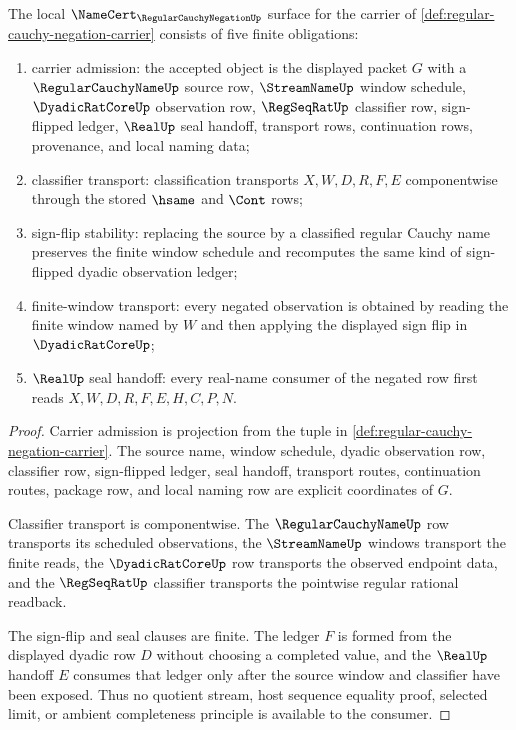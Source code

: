 \begin{theorem}
\label{thm:regular-cauchy-negation-namecert-obligations}
The local $\NameCert_{\RegularCauchyNegationUp}$ surface for the carrier of \autoref{def:regular-cauchy-negation-carrier} consists of five finite obligations:
\begin{enumerate}
\item carrier admission: the accepted object is the displayed packet $G$ with a $\RegularCauchyNameUp$ source row, $\StreamNameUp$ window schedule, $\DyadicRatCoreUp$ observation row, $\RegSeqRatUp$ classifier row, sign-flipped ledger, $\RealUp$ seal handoff, transport rows, continuation rows, provenance, and local naming data;
\item classifier transport: classification transports $X,W,D,R,F,E$ componentwise through the stored $\hsame$ and $\Cont$ rows;
\item sign-flip stability: replacing the source by a classified regular Cauchy name preserves the finite window schedule and recomputes the same kind of sign-flipped dyadic observation ledger;
\item finite-window transport: every negated observation is obtained by reading the finite window named by $W$ and then applying the displayed sign flip in $\DyadicRatCoreUp$;
\item $\RealUp$ seal handoff: every real-name consumer of the negated row first reads $X,W,D,R,F,E,H,C,P,N$.
\end{enumerate}
\end{theorem}
\begin{proof}
Carrier admission is projection from the tuple in \autoref{def:regular-cauchy-negation-carrier}. The source name, window schedule, dyadic observation row, classifier row, sign-flipped ledger, seal handoff, transport routes, continuation routes, package row, and local naming row are explicit coordinates of $G$.

Classifier transport is componentwise. The $\RegularCauchyNameUp$ row transports its scheduled observations, the $\StreamNameUp$ windows transport the finite reads, the $\DyadicRatCoreUp$ row transports the observed endpoint data, and the $\RegSeqRatUp$ classifier transports the pointwise regular rational readback.

The sign-flip and seal clauses are finite. The ledger $F$ is formed from the displayed dyadic row $D$ without choosing a completed value, and the $\RealUp$ handoff $E$ consumes that ledger only after the source window and classifier have been exposed. Thus no quotient stream, host sequence equality proof, selected limit, or ambient completeness principle is available to the consumer.
\end{proof}


